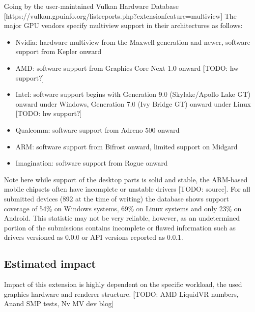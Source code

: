 Going by the user-maintained Vulkan Hardware Database [https://vulkan.gpuinfo.org/listreports.php?extensionfeature=multiview]
The major GPU vendors specify multiview support in their architectures as follows: 
\begin{itemize}
\item Nvidia: hardware multiview from the Maxwell generation and newer, software support from Kepler onward
\item AMD: software support from Graphics Core Next 1.0 onward [TODO: hw support?]
\item Intel: software support begins with Generation 9.0 (Skylake/Apollo Lake GT) onward under Windows, Generation 7.0 (Ivy Bridge GT) onward under Linux [TODO: hw support?]
\item Qualcomm: software support from Adreno 500 onward
\item ARM: software support from Bifrost onward, limited support on Midgard
\item Imagination: software support from Rogue onward
\end{itemize}
Note here while support of the desktop parts is solid and stable, the ARM-based mobile chipsets often have incomplete or unstable drivers [TODO: source]. 
For all submitted devices (892 at the time of writing) the database shows support coverage of 54\% on Windows systems, 69\% on Linux systems and only 23\% on Android. This statistic may not be very reliable, however, as an undetermined portion of the submissions contains incomplete or flawed information such as drivers versioned as 0.0.0 or API versions reported as 0.0.1. 

\subsection{Estimated impact}
Impact of this extension is highly dependent on the specific workload, the used graphics hardware and renderer structure. 
[TODO: AMD LiquidVR numbers, Anand SMP tests, Nv MV dev blog]

